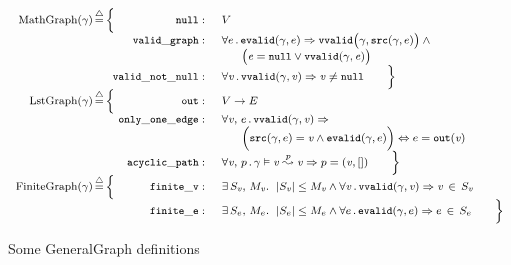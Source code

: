 \begin{figure}
\begin{equation*}
{\footnotesize
\begin{array}{r@{}c@{}c@{\!}rl}
        \mathrm{MathGraph}(\gamma)\,&\defeq&\,\Big\{&\mathtt{null}:&\; V\\
          &&&\mathtt{valid\_graph}:&\; \forall e\,.\,\mathtt{evalid}(\gamma, e) \Rightarrow
          \mathtt{vvalid}\big(\gamma, \mathtt{src}(\gamma, e)\big)\wedge \null \\
          &&&&\qquad \big(\m{e} = \mathtt{null} \vee \mathtt{vvalid}(\gamma, \m{e})\big)\\
          &&&\mathtt{valid\_not\_null}:&\; \forall \m{v}\,.\,\mathtt{vvalid}(\gamma, \m{v})
          \Rightarrow \m{v} \neq \mathtt{null} \qquad \Big\} \\
        \mathrm{LstGraph}(\gamma)\,&\defeq&\, \Big\{&\mathtt{out}:&\; V \rightarrow E\\
          &&&\mathtt{only\_one\_edge}:&\; \forall \m{v},\,e\,.\,
          \mathtt{vvalid}(\gamma, \m{v}) \Rightarrow \\
          &&&&\qquad \Big(\mathtt{src}(\gamma, e) =\m{v} \wedge
                \mathtt{evalid}(\gamma, e)\Big) \Leftrightarrow e = \mathtt{out}(\m{v})\\
          &&&\mathtt{acyclic\_path}:&\; \forall \m{v},\,p\,.\,
          \gamma \vDash \m{v} \overset{p}{\leadsto} \m{v} \Rightarrow p = (\m{v},[]) \qquad \Big\} \\
       	\mathrm{FiniteGraph}(\gamma)\,&\defeq&\, \Big\{&\mathtt{finite\_v}:&\;\exists\, S_\m{v},\, M_\m{v}.~\;\lvert S_\m{v}\rvert
          \leq M_\m{v} \wedge
          \forall \m{v}\,.\, \mathtt{vvalid}(\gamma,\m{v})\Rightarrow \m{v}\,\in\,S_\m{v}\\
          &&&\mathtt{finite\_e}:&\;\exists\, S_e,\, M_e.~\;\lvert S_e\rvert
          \leq M_e \wedge
          \forall e\,.\, \mathtt{evalid}(\gamma,e)\Rightarrow e\,\in\,S_e \qquad \Big\}
\end{array}}
\end{equation*}
\caption{Some GeneralGraph definitions}
\label{fig:gengraphdefs}
\vspace{-1em}

\end{figure} 